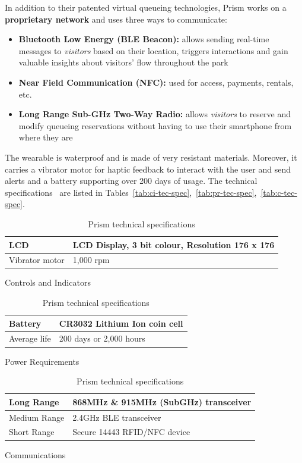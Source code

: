 In addition to their patented virtual queueing technologies, Prism works on a \textbf{proprietary network} and uses three ways to communicate:
\begin{itemize}
    \item \textbf{Bluetooth Low Energy (BLE Beacon):} allows sending real-time messages to \textit{visitors} based on their location, triggers interactions and gain valuable insights about visitors' flow throughout the park
    \item \textbf{Near Field Communication (NFC):} used for access, payments, rentals, etc.
    \item \textbf{Long Range Sub-GHz Two-Way Radio:} allows \textit{visitors} to reserve and modify queueing reservations without having to use their smartphone from where they are
\end{itemize}

The wearable is waterproof and is made of very resistant materials.
Moreover, it carries a vibrator motor for haptic feedback to interact with the user and send alerts and a battery supporting over 200 days of usage.
The technical specifications~\cite{prism-manual} are listed in Tables~\ref{tab:ci-tec-spec},~\ref{tab:pr-tec-spec},~\ref{tab:c-tec-spec}.

\begin{table}[H]
    \centering
\begin{subtable}[t]{0.85\textwidth}
    \centering
    \begin{tabular}{|l|l|}
        \hline
        LCD & LCD Display, 3 bit colour, Resolution 176 x 176 \\ \hline
        Vibrator motor & 1,000 rpm \\
        \hline
    \end{tabular}
    \caption{Controls and Indicators}
    \label{tab:ci-tec-spec}
\end{subtable}
\begin{subtable}[t]{0.85\textwidth}
    \centering
    \begin{tabular}{|l|l|}
        \hline
        Battery & CR3032 Lithium Ion coin cell \\ \hline
        Average life & 200 days or 2,000 hours \\
        \hline
    \end{tabular}
    \caption{Power Requirements}
    \label{tab:pr-tec-spec}
\end{subtable}
\begin{subtable}[t]{0.85\textwidth}
    \centering
    \begin{tabular}{|l|l|}
        \hline
        Long Range & 868MHz \& 915MHz (SubGHz) transceiver \\ \hline
        Medium Range & 2.4GHz BLE transceiver \\ \hline
        Short Range & Secure 14443 RFID/NFC device \\
        \hline
    \end{tabular}
    \caption{Communications}
    \label{tab:c-tec-spec}
\end{subtable}
    \caption{Prism technical specifications}
    \label{tab:prism-tech-spec}
\end{table}

